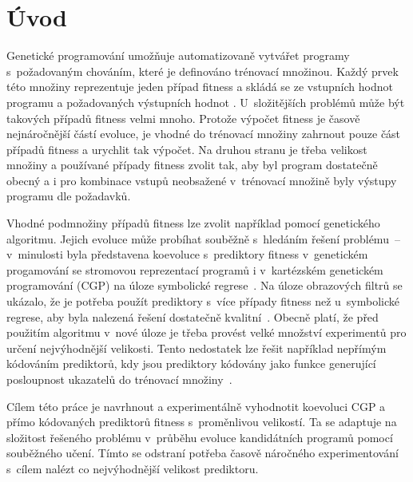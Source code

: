 \documentclass[czech]{ExcelAtFIT} %
\affiliation{*%
    \href{mailto:xwigla00@stud.fit.vutbr.cz}{xwigla00@stud.fit.vutbr.cz},
    \textit{Fakulta informačních technologií, Vysoké učení technické v~Brně}}
\begin{document}
\startdocument



\section{Úvod}

Genetické programování umožňuje automatizovaně vytvářet programy s~požadovaným chováním, které je definováno trénovací množinou. Každý prvek této množiny reprezentuje jeden případ fitness a skládá se ze vstupních hodnot programu a po\-ža\-do\-va\-ných vý\-stup\-ních hodnot \cite{HandbookGP}. U~složitějších problémů může být ta\-ko\-vých případů fitness velmi mnoho. Protože vý\-po\-čet fitness je časově nejnáročnější částí evoluce, je vhodné do trénovací množiny zahrnout pouze část případů fitness a urychlit tak výpočet. Na druhou stranu je třeba velikost množiny a používané případy fitness zvolit tak, aby byl program dostatečně obecný a i pro kombinace vstupů neobsažené v~trénovací množině byly výstupy programu dle požadavků.

Vhodné podmnožiny případů fitness lze zvolit na\-příklad pomocí genetického algoritmu. Jejich evoluce může probíhat souběžně s~hledáním řešení prob\-lému~-- v~minulosti byla představena ko\-evo\-luce s~pre\-dik\-tory fitness v~genetickém progamování se stromovou re\-pre\-zen\-tací programů \cite{Schmidt} i v~kartézském genetickém pro\-gra\-mo\-vání (CGP) na úloze symbolické regrese~\cite{SikuEuroGP}. Na úloze obrazových filtrů se ukázalo, že je potřeba použít prediktory s~více případy fitness než u~symbolické regrese, aby byla na\-le\-zená řešení dostatečně kvalitní~\cite{SikuPPSN}. Obecně platí, že před použitím algoritmu v~nové úloze je třeba provést velké množství experimentů pro určení nejvýhodnější velikosti. Tento nedostatek lze řešit například nepřímým kódováním prediktorů, kdy jsou prediktory kódovány jako funkce generující posloupnost uka\-za\-telů do trénovací množiny~\cite{SikuHulva}.

Cílem této práce je navrhnout a experimentálně vyhodnotit koevoluci CGP a přímo kódovaných prediktorů fitness s~proměnlivou velikostí. Ta se adaptuje na složitost řešeného problému v~průběhu evoluce kandidátních programů pomocí souběžného učení. Tímto se odstraní potřeba časově náročného experimentování s~cílem nalézt co nejvýhodnější velikost prediktoru.
\end{document}

